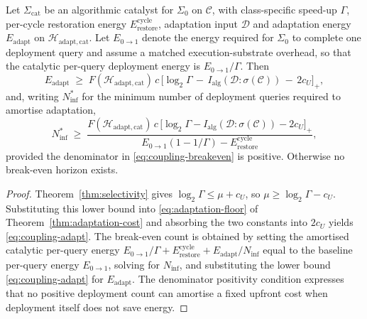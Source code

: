\documentclass[runningheads]{llncs}
\newcommand{\Erasure}{c}
\newcommand{\Sys}{\Sigma}
\newcommand{\Fover}{F}
\newcommand{\Hw}{\mathcal{H}}
\newcommand{\Class}{\mathcal{C}}
\newcommand{\Erestore}{E_{\mathrm{restore}}^{\mathrm{cycle}}}
\newcommand{\Eadapt}{E_{\mathrm{adapt}}}
\newcommand{\MutInfo}{I_{\mathrm{alg}}}
\begin{document}
\begin{theorem}
\label{thm:coupling}
Let $\Sys_{\mathrm{cat}}$ be an algorithmic catalyst for $\Sys_0$ on
$\Class$, with class-specific speed-up $\Gamma$, per-cycle
restoration energy $\Erestore$, adaptation input $\mathcal{D}$ and
adaptation energy $\Eadapt$ on $\Hw_{\mathrm{adapt,cat}}$. Let \(E_{0\to 1}\) denote the energy required for \(\Sys_0\) to
complete one deployment query and assume a matched execution-substrate overhead, so that
the catalytic per-query deployment energy is $E_{0\to 1}/\Gamma$.
Then
\begin{equation}
\label{eq:coupling-adapt}
\Eadapt\;\ge\;
\Fover(\Hw_{\mathrm{adapt,cat}})\,\Erasure\,
\bigl[\log_2\Gamma\,-\,\MutInfo(\mathcal{D}:\sigma(\Class))
\,-\,2c_U\bigr]_+,
\end{equation}
and, writing \(N_{\mathrm{inf}}^{*}\) for the minimum number of
deployment queries required to amortise adaptation, 
\begin{equation}
\label{eq:coupling-breakeven}
N_{\mathrm{inf}}^{*}\;\ge\;
\frac{\Fover(\Hw_{\mathrm{adapt,cat}})\,\Erasure\,
\bigl[\log_2\Gamma-\MutInfo(\mathcal{D}:\sigma(\Class))-2c_U\bigr]_+}
{E_{0\to 1}(1-1/\Gamma)-\Erestore},
\end{equation}
provided the denominator in \eqref{eq:coupling-breakeven} is
positive. Otherwise no break-even horizon exists.
\end{theorem}
\begin{proof}
Theorem~\ref{thm:selectivity} gives $\log_2\Gamma\le\mu+c_U$, so
$\mu\ge\log_2\Gamma-c_U$. Substituting this lower bound into
\eqref{eq:adaptation-floor} of Theorem~\ref{thm:adaptation-cost}
and absorbing the two constants into $2c_U$ yields
\eqref{eq:coupling-adapt}. The break-even count is obtained by
setting the amortised catalytic per-query energy
$E_{0\to 1}/\Gamma+\Erestore+\Eadapt/N_{\mathrm{inf}}$ equal to the
baseline per-query energy $E_{0\to 1}$, solving for
$N_{\mathrm{inf}}$, and substituting the lower bound
\eqref{eq:coupling-adapt} for $\Eadapt$. The denominator positivity
condition expresses that no positive deployment count can amortise
a fixed upfront cost when deployment itself does not save energy.
\end{proof}
\end{document}
